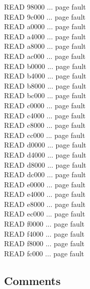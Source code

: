 \documentclass{article}
\begin{document}
READ 98000 ... page fault\\
READ 9c000 ... page fault\\
READ a0000 ... page fault\\
READ a4000 ... page fault\\
READ a8000 ... page fault\\
READ ac000 ... page fault\\
READ b0000 ... page fault\\
READ b4000 ... page fault\\
READ b8000 ... page fault\\
READ bc000 ... page fault\\
READ c0000 ... page fault\\
READ c4000 ... page fault\\
READ c8000 ... page fault\\
READ cc000 ... page fault\\
READ d0000 ... page fault\\
READ d4000 ... page fault\\
READ d8000 ... page fault\\
READ dc000 ... page fault\\
READ e0000 ... page fault\\
READ e4000 ... page fault\\
READ e8000 ... page fault\\
READ ec000 ... page fault\\
READ f0000 ... page fault\\
READ f4000 ... page fault\\
READ f8000 ... page fault\\
READ fc000 ... page fault

\rmfamily
\normalsize

\subsection{Comments}
\end{document}
